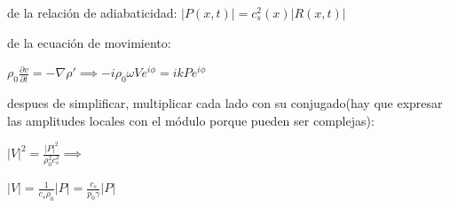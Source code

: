 \documentclass{article}
\begin{document}
\begin{description}  
\item de la relación de adiabaticidad: $|P(x,t)| = c_s^{2}(x) |R(x,t)|$
\item de la ecuación de movimiento: 
\item $\rho_0 \frac{\partial v}{\partial t} = -\nabla \rho\prime \implies -i \rho_0 \omega V e^{i\phi} = i k P e^{i\phi}$
\item despues de simplificar,  multiplicar cada lado con su conjugado(hay que expresar las amplitudes locales con el módulo porque pueden ser complejas):
\item  $|V|^2 = \frac{|P|^2}{\rho_0^{2} c_s^2} \implies$ 
\item $|V|= \frac{1}{c_s \rho_0} |P| = \frac{c_s}{p_0 \gamma} |P|$ 


\end{description}
\end{document}

